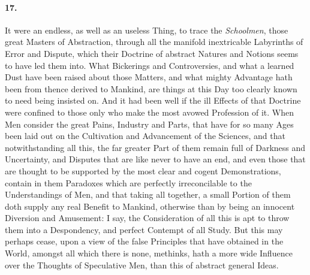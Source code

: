 \documentclass[]{article}
\newenvironment{sectionbody}{\begin{multicols}{2}}{\end{multicols}}
\begin{document}
\begin{sectionbody}
\paragraph{17.} It were an endless, as well as an useless Thing, to trace the
\emph{Schoolmen}, those great Masters of Abstraction, through
all the manifold inextricable Labyrinths of Error and Dispute,
which their Doctrine of abstract Natures and Notions seems to
have led them into.  What Bickerings and Controversies, and what
a learned Dust have been raised about those Matters, and what
mighty Advantage hath been from thence derived to Mankind, are
things at this Day too clearly known to need being insisted on.
And it had been well if the ill Effects of that Doctrine were
confined to those only who make the most avowed Profession of it.
When Men consider the great Pains, Industry and Parts, that have
for so many Ages been laid out on the Cultivation and Advancement
of the Sciences, and that notwithstanding all this, the far
greater Part of them remain full of Darkness and Uncertainty, and
Disputes that are like never to have an end, and even those that
are thought to be supported by the most clear and cogent
Demonstrations, contain in them Paradoxes which are perfectly
irreconcilable to the Understandings of Men, and that taking all
together, a small Portion of them doth supply any real Benefit to
Mankind, otherwise than by being an innocent Diversion and
Amusement: I say, the Consideration of all this is apt to throw
them into a Despondency, and perfect Contempt of all Study.  But
this may perhaps cease, upon a view of the false Principles that
have obtained in the World, amongst all which there is none,
methinks, hath a more wide Influence over the Thoughts of
Speculative Men, than this of abstract general Ideas.




\end{sectionbody}
\end{document}
